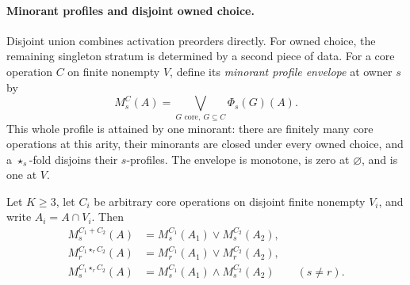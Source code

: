 \paragraph{Minorant profiles and disjoint owned choice.}
Disjoint union combines activation preorders directly. For owned choice,
the remaining singleton stratum is determined by a second piece of data.
For a core operation $C$ on finite nonempty $V$, define its
\emph{minorant profile envelope} at owner $s$ by
\[
 M_s^C(A)=\bigvee_{G\text{ core},\ G\subseteq C}\Phi_s(G)(A).
\]
This whole profile is attained by one minorant: there are finitely many
core operations at this arity, their minorants are closed under every
owned choice, and a $\star_s$-fold disjoins their $s$-profiles.
The envelope is monotone, is zero at $\varnothing$, and is one at $V$.

\begin{theorem}
\label{core:thm:disjoint-minorant-profiles}
Let $K\geq3$, let $C_i$ be arbitrary core operations on disjoint finite
nonempty $V_i$, and write $A_i=A\cap V_i$. Then
\[
 \begin{aligned}
 M_s^{C_1+C_2}(A)&=M_s^{C_1}(A_1)\lor M_s^{C_2}(A_2),\\
 M_r^{C_1\star_r C_2}(A)&=M_r^{C_1}(A_1)\lor M_r^{C_2}(A_2),\\
 M_s^{C_1\star_r C_2}(A)&=M_s^{C_1}(A_1)\land M_s^{C_2}(A_2)
       \qquad(s\ne r).
 \end{aligned}
\]
\end{theorem}
